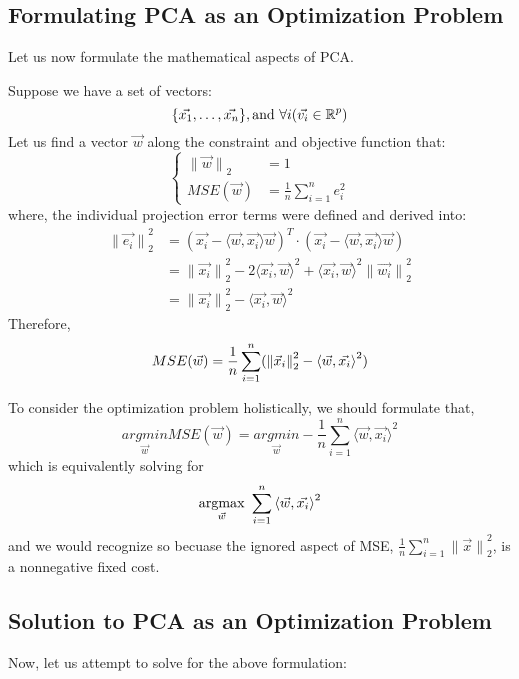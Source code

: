 \subsection{Formulating PCA as an Optimization Problem}
Let us now formulate the mathematical aspects of PCA.
\par
Suppose we have a set of vectors:
\[
    \{\vec{x_1}, \dots, \vec{x_n}\}, \text{and } \forall i (\vec{v_i} \in \R^p)
\]
Let us find a vector $\vec{w}$ along the constraint and objective function that:
\[
    \begin{cases}
        {\lVert \vec{w} \rVert}_2 &= 1 \\
        MSE(\vec{w}) &= \frac{1}{n} \sum_{i = 1}^n e_i^2
    \end{cases}
\]
where, the individual projection error terms were defined and derived into:
\begin{align*}
    {\lVert \vec{e_i} \rVert}_2^2
    &= {(\vec{x_i} - \langle \vec{w}, \vec{x_i} \rangle \vec{w})}^T \cdot (\vec{x_i} - \langle \vec{w}, \vec{x_i} \rangle \vec{w}) \\
    &= {\lVert \vec{x_i} \rVert}_2^2 - 2 {\langle \vec{x_i}, \vec{w} \rangle}^2 + {\langle \vec{x_i}, \vec{w} \rangle}^2 {\lVert \vec{w_i} \rVert}_2^2 \\
    &= {\lVert \vec{x_i} \rVert}_2^2 - {\langle \vec{x_i}, \vec{w} \rangle}^2
\end{align*}
Therefore,
\[
    MSE(\vec{w}) = \frac{1}{n} \sum_{i = 1}^n (\pnorm[2]{\vec{x}_i}{2} - {\langle \vec{w}, \vec{x_i} \rangle}^2)
\]
\par
To consider the optimization problem holistically, we should formulate that,
\[
    \underset{\vec{w}}{argmin} MSE(\vec{w}) = \underset{\vec{w}}{argmin} -\frac{1}{n} \sum_{i = 1}^n {\langle \vec{w}, \vec{x_i} \rangle}^2
\]
which is equivalently solving for
\[
    \underset{\vec{w}}{\rm argmax} \ \sum_{i = 1}^n {\langle \vec{w}, \vec{x_i} \rangle}^2
\]
and we would recognize so becuase the ignored aspect of MSE, $\frac{1}{n} \sum_{i = 1}^n {\lVert \vec{x} \rVert}_2^2$, is a nonnegative fixed cost.

\subsection{Solution to PCA as an Optimization Problem}
Now, let us attempt to solve for the above formulation:

